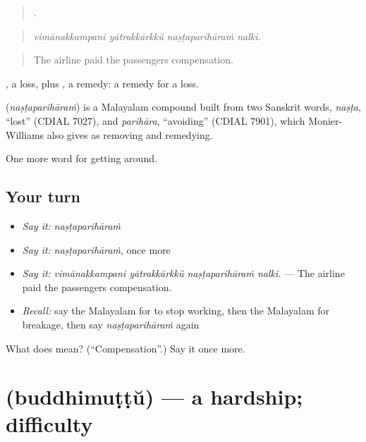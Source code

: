 \begin{quote}
   .
\end{quote}

\begin{quote}
\emph{vimānakkampani yātrakkārkkŭ naṣṭaparihāraṁ nalki.}
\end{quote}

\begin{quote}
The airline paid the passengers compensation.
\end{quote}

, a loss, plus , a remedy: a remedy for a loss.

\begin{cousinweb}
\textbf{} (\emph{naṣṭaparihāraṁ}) is a Malayalam compound built from two Sanskrit words, \emph{naṣṭa}, \textquotedblleft{}lost\textquotedblright{} (CDIAL 7027), and \emph{parihāra}, \textquotedblleft{}avoiding\textquotedblright{} (CDIAL 7901), which Monier-Williams also gives as removing and remedying.
\end{cousinweb}

\begin{grammarlens}[title={What you've built}]
One more word for getting around.
\end{grammarlens}

\subsection*{Your turn}
\begin{itemize}
\raggedright
  \item \emph{Say it:} \emph{naṣṭaparihāraṁ}
  \item \emph{Say it:} \emph{naṣṭaparihāraṁ}, once more
  \item \emph{Say it:} \emph{vimānakkampani yātrakkārkkŭ naṣṭaparihāraṁ nalki.} — The airline paid the passengers compensation.
  \item \emph{Recall:} say the Malayalam for to stop working, then the Malayalam for breakage, then say \emph{naṣṭaparihāraṁ} again
\end{itemize}

\begin{tcolorbox}[breakable,colback=teal!4,colframe=teal!35!black,title={Before you move on}]
What does  mean? (\textquotedblleft{}Compensation\textquotedblright{}.) Say it once more.
\end{tcolorbox}
\section[\texorpdfstring{\ml{ബുദ്ധിമുട്ട്} (buddhimuṭṭŭ)}{ബുദ്ധിമുട്ട് (buddhimuṭṭŭ)}]{ (buddhimuṭṭŭ) — a hardship; difficulty}

